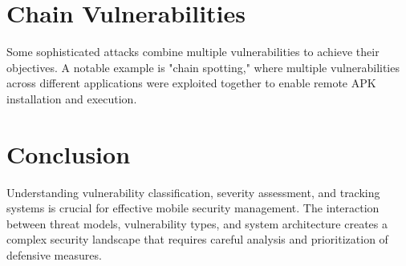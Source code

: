 \documentclass{article}
\begin{document}
\section{Chain Vulnerabilities}
Some sophisticated attacks combine multiple vulnerabilities to achieve their objectives. A notable example is "chain spotting," where multiple vulnerabilities across different applications were exploited together to enable remote APK installation and execution.

\section{Conclusion}
Understanding vulnerability classification, severity assessment, and tracking systems is crucial for effective mobile security management. The interaction between threat models, vulnerability types, and system architecture creates a complex security landscape that requires careful analysis and prioritization of defensive measures.
\end{document}
